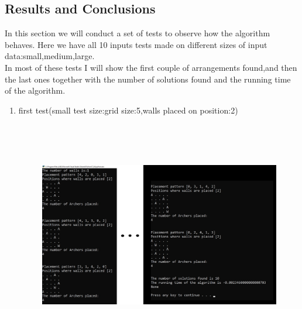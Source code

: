 \documentclass{article}
\begin{document}
\subsection{Results and Conclusions}
\par In this section we will conduct a set of tests to observe how the algorithm behaves.
Here we have all 10 inputs tests made on different sizes of input data:small,medium,large.
\\In most of these tests I will show the first couple of arrangements found,and then the last ones together with the number of solutions found and the running time of the algorithm.
\Large
\begin{enumerate}
\item first test(small test size:grid size:5,walls placed on position:2)
\begin{figure}[h]
\includegraphics[width=12 cm, height=10cm]{test1}
\end{figure}
\newpage


\end{enumerate}
\end{document}
